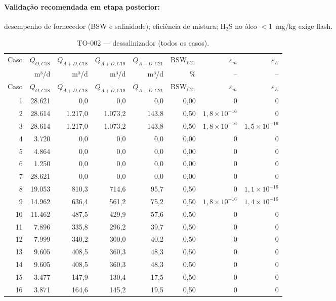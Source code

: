 \documentclass[11pt,a4paper]{article}
\numberwithin{equation}{section}
\numberwithin{table}{section}
\numberwithin{figure}{section}
\begin{document}
\paragraph{Validação recomendada em etapa posterior:} desempenho de fornecedor (BSW e salinidade); eficiência de mistura; H$_2$S no óleo $<1$~mg/kg exige flash.
{\footnotesize\setlength{\tabcolsep}{3.5pt}\begin{longtable}{rrrrrrrr}
\caption{TO-002 --- dessalinizador (todos os casos).\label{tab:b11}}\\\toprule
Caso & $Q_{O,C18}$ & $Q_{A+D,C18}$ & $Q_{A+D,C19}$ & $Q_{A+D,C21}$ & BSW$_{C21}$ & $\varepsilon_m$ & $\varepsilon_E$\\
 & m³/d & m³/d & m³/d & m³/d & \% & -- & --\\\midrule\endfirsthead
\toprule Caso & $Q_{O,C18}$ & $Q_{A+D,C18}$ & $Q_{A+D,C19}$ & $Q_{A+D,C21}$ & BSW$_{C21}$ & $\varepsilon_m$ & $\varepsilon_E$\\\midrule\endhead
1 & 28.621 & 0,0 & 0,0 & 0,0 & 0,00 & $0$ & $0$\\
2 & 28.614 & 1.217,0 & 1.073,2 & 143,8 & 0,50 & $1{,}8\times10^{-16}$ & $0$\\
3 & 28.614 & 1.217,0 & 1.073,2 & 143,8 & 0,50 & $1{,}8\times10^{-16}$ & $1{,}5\times10^{-16}$\\
4 & 3.720 & 0,0 & 0,0 & 0,0 & 0,00 & $0$ & $0$\\
5 & 4.864 & 0,0 & 0,0 & 0,0 & 0,00 & $0$ & $0$\\
6 & 1.250 & 0,0 & 0,0 & 0,0 & 0,00 & $0$ & $0$\\
7 & 28.621 & 0,0 & 0,0 & 0,0 & 0,00 & $0$ & $0$\\
8 & 19.053 & 810,3 & 714,6 & 95,7 & 0,50 & $0$ & $1{,}1\times10^{-16}$\\
9 & 14.962 & 636,4 & 561,2 & 75,2 & 0,50 & $1{,}8\times10^{-16}$ & $1{,}4\times10^{-16}$\\
10 & 11.462 & 487,5 & 429,9 & 57,6 & 0,50 & $0$ & $0$\\
11 & 7.896 & 335,8 & 296,2 & 39,7 & 0,50 & $0$ & $0$\\
12 & 7.999 & 340,2 & 300,0 & 40,2 & 0,50 & $0$ & $0$\\
13 & 9.605 & 408,5 & 360,3 & 48,3 & 0,50 & $0$ & $0$\\
14 & 9.605 & 408,5 & 360,3 & 48,3 & 0,50 & $0$ & $0$\\
15 & 3.477 & 147,9 & 130,4 & 17,5 & 0,50 & $0$ & $0$\\
16 & 3.871 & 164,6 & 145,2 & 19,5 & 0,50 & $0$ & $0$\\
\bottomrule\end{longtable}}
\end{document}

